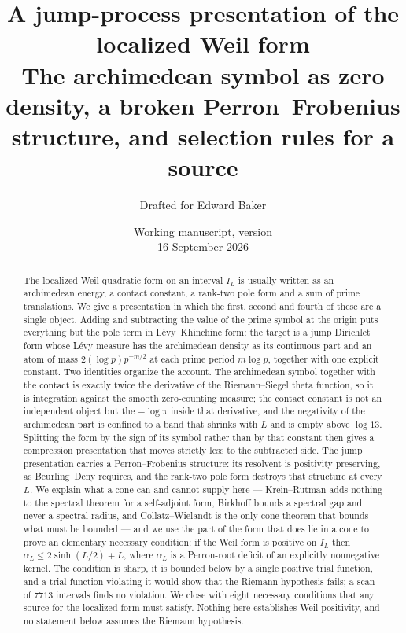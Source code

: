 \documentclass[11pt]{article}
\title{A jump-process presentation of the localized Weil form\\[5pt]
\large The archimedean symbol as zero density, a broken Perron--Frobenius
structure, and selection rules for a source}
\author{Drafted for Edward Baker}
\date{Working manuscript, version \draftversion\\16 September 2026}
\numberwithin{equation}{section}
\theoremstyle{definition}
\theoremstyle{remark}
\begin{document}
\maketitle
\begin{abstract}
The localized Weil quadratic form on an interval $I_L$ is usually written as an
archimedean energy, a contact constant, a rank-two pole form and a sum of prime
translations. We give a presentation in which the first, second and fourth of
these are a single object. Adding and subtracting the value of the prime symbol
at the origin puts everything but the pole term in L\'evy--Khinchine form: the
target is a jump Dirichlet form whose L\'evy measure has the archimedean density
as its continuous part and an atom of mass $2(\log p)p^{-m/2}$ at each prime
period $m\log p$, together with one explicit constant. Two identities organize
the account. The archimedean symbol together with the contact is exactly twice
the derivative of the Riemann--Siegel theta function, so it is integration
against the smooth zero-counting measure; the contact constant is not an
independent object but the $-\log\pi$ inside that derivative, and the negativity
of the archimedean part is confined to a band that shrinks with $L$ and is empty
above $\log13$. Splitting the form by the sign of its symbol rather than by that
constant then gives a compression presentation that moves strictly less to the
subtracted side. The jump presentation carries a Perron--Frobenius structure:
its resolvent is positivity preserving, as Beurling--Deny requires, and the
rank-two pole form destroys that structure at every $L$. We explain what a cone
can and cannot supply here --- Krein--Rutman adds nothing to the spectral theorem
for a self-adjoint form, Birkhoff bounds a spectral gap and never a spectral
radius, and Collatz--Wielandt is the only cone theorem that bounds what must be
bounded --- and we use the part of the form that does lie in a cone to prove an
elementary necessary condition: if the Weil form is positive on $I_L$ then
$\alpha_L\le2\sinh(L/2)+L$, where $\alpha_L$ is a Perron-root deficit of an
explicitly nonnegative kernel. The condition is sharp, it is bounded below by a
single positive trial function, and a trial function violating it would show
that the Riemann hypothesis fails; a scan of $7713$ intervals finds no
violation. We close with eight necessary conditions that any source for the
localized form must satisfy. Nothing here establishes Weil positivity, and no
statement below assumes the Riemann hypothesis.
\end{abstract}

\clearpage
{\small\tableofcontents}
\clearpage








\appendix

\clearpage
{}
{}

\end{document}
